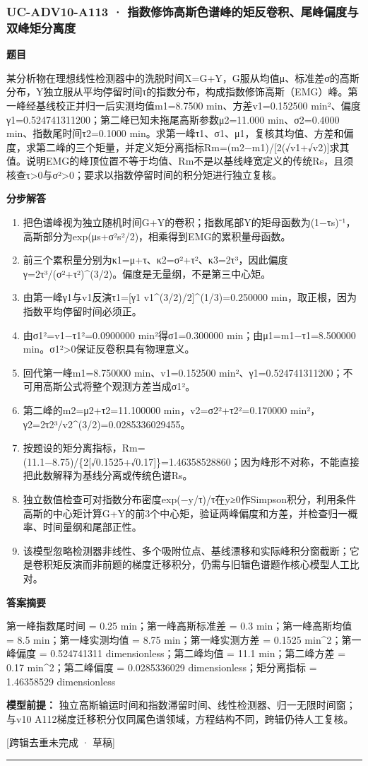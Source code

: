 \documentclass[UTF8,11pt,a4paper]{ctexart}
\begin{document}
\subsubsection*{UC-ADV10-A113 · 指数修饰高斯色谱峰的矩反卷积、尾峰偏度与双峰矩分离度}
\noindent\textbf{题目}\par
某分析物在理想线性检测器中的洗脱时间X=G+Y，G服从均值μ、标准差σ的高斯分布，Y独立服从平均停留时间τ的指数分布，构成指数修饰高斯（EMG）峰。第一峰经基线校正并归一后实测均值m1=8.7500 min、方差v1=0.152500 min²、偏度γ1=0.524741311200；第二峰已知未拖尾高斯参数μ2=11.000 min、σ2=0.4000 min、指数尾时间τ2=0.1000 min。求第一峰τ1、σ1、μ1，复核其均值、方差和偏度，求第二峰的三个矩量，并定义矩分离指标Rm=(m2−m1)/[2(√v1+√v2)]求其值。说明EMG的峰顶位置不等于均值、Rm不是以基线峰宽定义的传统Rs，且须核查τ>0与σ²>0；要求以指数停留时间的积分矩进行独立复核。\par
\medskip\noindent\textbf{分步解答}
\begin{enumerate}
\item 把色谱峰视为独立随机时间G+Y的卷积；指数尾部Y的矩母函数为(1−τs)⁻¹，高斯部分为exp(μs+σ²s²/2)，相乘得到EMG的累积量母函数。
\item 前三个累积量分别为κ1=μ+τ、κ2=σ²+τ²、κ3=2τ³，因此偏度γ=2τ³/(σ²+τ²)\textasciicircum{}(3/2)。偏度是无量纲，不是第三中心矩。
\item 由第一峰γ1与v1反演τ1=[γ1 v1\textasciicircum{}(3/2)/2]\textasciicircum{}(1/3)=0.250000 min，取正根，因为指数平均停留时间必须正。
\item 由σ1²=v1−τ1²=0.0900000 min²得σ1=0.300000 min；由μ1=m1−τ1=8.500000 min。σ1²>0保证反卷积具有物理意义。
\item 回代第一峰m1=8.750000 min、v1=0.152500 min²、γ1=0.524741311200；不可用高斯公式将整个观测方差当成σ1²。
\item 第二峰的m2=μ2+τ2=11.100000 min，v2=σ2²+τ2²=0.170000 min²，γ2=2τ2³/v2\textasciicircum{}(3/2)=0.0285336029455。
\item 按题设的矩分离指标，Rm=(11.1−8.75)/\{2[√0.1525+√0.17]\}=1.46358528860；因为峰形不对称，不能直接把此数解释为基线分离或传统色谱Rs。
\item 独立数值检查可对指数分布密度exp(−y/τ)/τ在y≥0作Simpson积分，利用条件高斯的中心矩计算G+Y的前3个中心矩，验证两峰偏度和方差，并检查归一概率、时间量纲和尾部正性。
\item 该模型忽略检测器非线性、多个吸附位点、基线漂移和实际峰积分窗截断；它是卷积矩反演而非前题的梯度迁移积分，仍需与旧辑色谱题作核心模型人工比对。
\end{enumerate}
\noindent\textbf{答案摘要}\par
第一峰指数尾时间 = 0.25 min；第一峰高斯标准差 = 0.3 min；第一峰高斯均值 = 8.5 min；第一峰实测均值 = 8.75 min；第一峰实测方差 = 0.1525 min\textasciicircum{}2；第一峰偏度 = 0.524741311 dimensionless；第二峰均值 = 11.1 min；第二峰方差 = 0.17 min\textasciicircum{}2；第二峰偏度 = 0.0285336029 dimensionless；矩分离指标 = 1.46358529 dimensionless\par
\noindent\textbf{模型前提：}
独立高斯输运时间和指数滞留时间、线性检测器、归一无限时间窗；与v10 A112梯度迁移积分仅同属色谱领域，方程结构不同，跨辑仍待人工复核。\par
\noindent\textcolor{red!65!black}{[跨辑去重未完成 · 草稿]} \par
\medskip\hrule\medskip
{}
\end{document}
